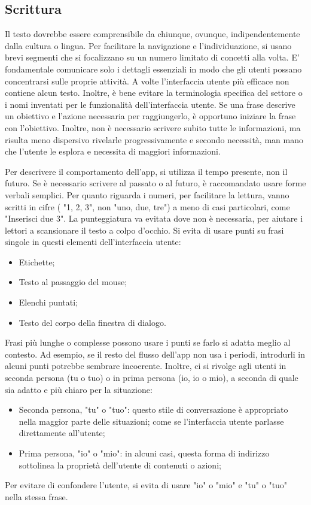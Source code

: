 \documentclass[12pt, a4paper]{report}
\begin{document}
	\subsection{Scrittura}
	Il testo dovrebbe essere comprensibile da chiunque, ovunque, indipendentemente dalla cultura o lingua. Per facilitare la navigazione e l'individuazione, si usano brevi segmenti che si focalizzano su un numero limitato di concetti alla volta. E’ fondamentale comunicare solo
	i dettagli essenziali in modo che gli utenti possano concentrarsi sulle proprie attività. A volte l'interfaccia utente più efficace non contiene alcun testo.  Inoltre, è bene evitare la terminologia specifica del settore o i nomi inventati per le funzionalità dell'interfaccia utente.
	Se una frase descrive un obiettivo e l'azione necessaria per raggiungerlo, è opportuno iniziare la frase con l'obiettivo. Inoltre, non è necessario scrivere subito tutte le informazioni, ma risulta meno dispersivo rivelarle progressivamente e secondo necessità, man mano che l'utente le esplora e necessita di maggiori informazioni.


	Per descrivere il comportamento dell’app, si utilizza il tempo presente, non il futuro. Se è necessario scrivere al passato o al futuro, è raccomandato usare forme verbali semplici. Per quanto riguarda i numeri,  per facilitare la lettura, vanno scritti in cifre ( "1, 2, 3", non "uno, due, tre") a meno di casi particolari, come "Inserisci due 3".
	La punteggiatura va evitata dove non è necessaria, per aiutare i lettori a scansionare il testo a colpo d'occhio. Si evita di usare punti su frasi singole in questi elementi dell'interfaccia utente:
	\begin{itemize}
		\item Etichette;
		\item Testo al passaggio del mouse;
		\item Elenchi puntati;
		\item Testo del corpo della finestra di dialogo.
	\end{itemize}
	Frasi più lunghe o complesse possono usare i punti se farlo si adatta meglio al contesto. Ad esempio, se il resto del flusso dell'app non usa i periodi, introdurli in alcuni punti potrebbe sembrare incoerente.
	Inoltre, ci si rivolge agli utenti in seconda persona (tu o tuo) o in prima persona (io, io o mio), a seconda di quale sia adatto e più chiaro per la situazione:
	\begin{itemize}
		\item Seconda persona, "tu" o "tuo": questo stile di conversazione è appropriato nella maggior parte delle situazioni; come se l'interfaccia utente parlasse direttamente all'utente;
		\item Prima persona, "io"  o "mio": in alcuni casi, questa forma di indirizzo sottolinea la proprietà dell'utente di contenuti o azioni;
	\end{itemize}
	Per evitare di confondere l'utente, si evita di usare "io" o "mio" e "tu" o "tuo" nella stessa frase.
	
\end{document}

